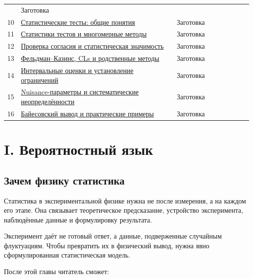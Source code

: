 \documentclass[
  russian,
  12pt,
  a4paper,
  a4paper,
  openany]{scrbook}
\begin{document}
{\begin{longtable}[]
{квадратов} & Заготовка \\
10 & \href{chapters/09_statistical_tests_basics.qmd}{Статистические
тесты: общие понятия} & Заготовка \\
11 &
\href{chapters/10_test_statistics_and_multivariate_methods.qmd}{Статистики
тестов и многомерные методы} & Заготовка \\
12 & \href{chapters/11_goodness_of_fit_and_significance.qmd}{Проверка
согласия и статистическая значимость} & Заготовка \\
13 & \href{chapters/12_feldman_cousins_and_cls.qmd}{Фельдман--Казинс,
CLs и родственные методы} & Заготовка \\
14 & \href{chapters/13_interval_estimation_and_limits.qmd}{Интервальные
оценки и установление ограничений} & Заготовка \\
15 &
\href{chapters/14_nuisance_parameters_and_systematics.qmd}{Nuisance-параметры
и систематические неопределённости} & Заготовка \\
16 & \href{chapters/15_bayesian_examples.qmd}{Байесовский вывод и
практические примеры} & Заготовка \\
\end{longtable}
}

\part{I. Вероятностный язык}

\chapter{Зачем физику
статистика}\label{ux437ux430ux447ux435ux43c-ux444ux438ux437ux438ux43aux443-ux441ux442ux430ux442ux438ux441ux442ux438ux43aux430}

Статистика в экспериментальной физике нужна не после измерения, а на
каждом его этапе. Она связывает теоретическое предсказание, устройство
эксперимента, наблюдённые данные и формулировку результата.

\begin{bookchapteropening}

Эксперимент даёт не готовый ответ, а данные, подверженные случайным
флуктуациям. Чтобы превратить их в физический вывод, нужна явно
сформулированная статистическая модель.

\end{bookchapteropening}

После этой главы читатель сможет:
\end{document}
